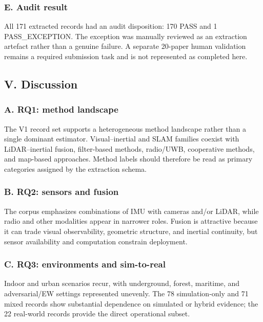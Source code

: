 \documentclass[
  journal,
  10pt]{IEEEtran}
\begin{document}
\subsubsection{E. Audit result}\label{e-audit-result}

All 171 extracted records had an audit disposition: 170 PASS and 1
PASS\_EXCEPTION. The exception was manually reviewed as an extraction
artefact rather than a genuine failure. A separate 20-paper human
validation remains a required submission task and is not represented as
completed here.

\subsection{V. Discussion}\label{v-discussion}

\subsubsection{A. RQ1: method landscape}\label{a-rq1-method-landscape}

The V1 record set supports a heterogeneous method landscape rather than
a single dominant estimator. Visual--inertial and SLAM families coexist
with LiDAR--inertial fusion, filter-based methods, radio/UWB,
cooperative methods, and map-based approaches. Method labels should
therefore be read as primary categories assigned by the extraction
schema.

\subsubsection{B. RQ2: sensors and
fusion}\label{b-rq2-sensors-and-fusion}

The corpus emphasizes combinations of IMU with cameras and/or LiDAR,
while radio and other modalities appear in narrower roles. Fusion is
attractive because it can trade visual observability, geometric
structure, and inertial continuity, but sensor availability and
computation constrain deployment.

\subsubsection{C. RQ3: environments and
sim-to-real}\label{c-rq3-environments-and-sim-to-real}

Indoor and urban scenarios recur, with underground, forest, maritime,
and adversarial/EW settings represented unevenly. The 78 simulation-only
and 71 mixed records show substantial dependence on simulated or hybrid
evidence; the 22 real-world records provide the direct operational
subset.
\end{document}

